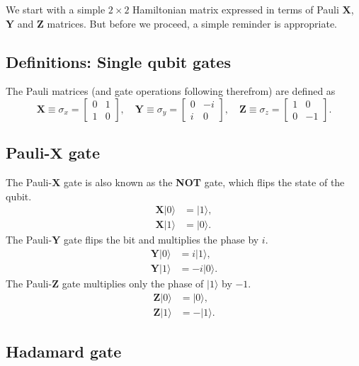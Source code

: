 \documentclass[%
oneside,                 %
final,                   %
10pt]{article}
\begin{document}
We start with a simple $2\times 2$ Hamiltonian matrix expressed in
terms of Pauli $\bm{X}$, $\bm{Y}$  and $\bm{Z}$ matrices. But before we proceed, a simple reminder is appropriate.

\subsection{Definitions: Single qubit gates}

The Pauli matrices (and gate operations following therefrom) are defined as
\[
	\bm{X} \equiv \sigma_x = \begin{bmatrix}
		0 & 1 \\
		1 & 0
	\end{bmatrix}, \quad
	\bm{Y} \equiv \sigma_y = \begin{bmatrix}
		0 & -i \\
		i & 0
	\end{bmatrix}, \quad
	\bm{Z} \equiv \sigma_z = \begin{bmatrix}
		1 & 0 \\
		0 & -1
	\end{bmatrix}.
\]

\subsection{Pauli-$\bm{X}$ gate}

The Pauli-$\bm{X}$ gate is also known as the \textbf{NOT} gate, which flips the state of the qubit.
\begin{align*}
	\bm{X}\vert 0\rangle &= \vert 1\rangle, \\
	\bm{X}\vert 1\rangle &= \vert 0\rangle.	
\end{align*}
The Pauli-$\bm{Y}$ gate flips the bit and multiplies the phase by $ i $. 
\begin{align*}
	\bm{Y}\vert 0\rangle &= i\vert 1\rangle, \\
	\bm{Y}\vert 1\rangle &= -i\vert 0\rangle.
\end{align*}
The Pauli-$\bm{Z}$ gate multiplies only the phase of $\vert 1\rangle$ by $ -1 $.
\begin{align*}
	\bm{Z}\vert 0\rangle &= \vert 0\rangle, \\
	\bm{Z}\vert 1\rangle &= -\vert 1\rangle.
\end{align*}

\subsection{Hadamard gate}
\end{document}
